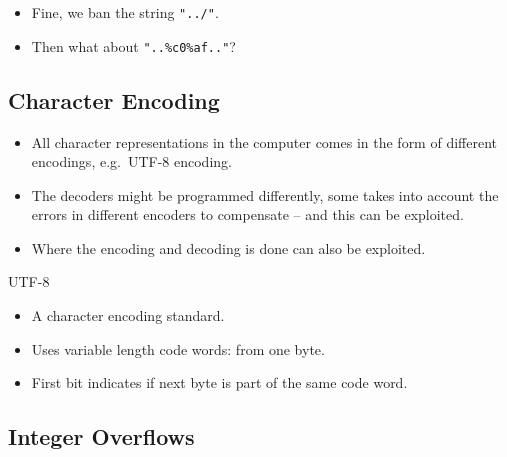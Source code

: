 \begin{frame}
  \begin{itemize}
    \item Fine, we ban the string \texttt{"../"}.

    \item Then what about \texttt{"..\%c0\%af.."}?

  \end{itemize}
\end{frame}

\subsection{Character Encoding}

\begin{frame}
  \begin{itemize}
    \item All character representations in the computer comes in the form of 
      different encodings, e.g.\ UTF-8 encoding.

    \item The decoders might be programmed differently, some takes into account 
      the errors in different encoders to compensate -- and this can be 
      exploited.

    \item Where the encoding and decoding is done can also be exploited.

  \end{itemize}
\end{frame}

\begin{frame}
  \begin{block}{UTF-8}
    \begin{itemize}
      \item A character encoding standard.
      \item Uses variable length code words: from one byte.
      \item First bit indicates if next byte is part of the same code word.
    \end{itemize}
  \end{block}
\end{frame}


\subsection{Integer Overflows}

